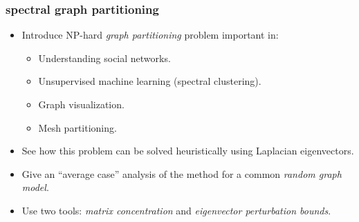 \documentclass[compress]{beamer}
\newcommand{\bv}[1]{\mathbf{#1}}
\DeclareMathOperator*{\argmax}{arg\,max}
\begin{document}

\begin{frame}
	\frametitle{spectral graph partitioning}
	\begin{itemize}
		\item Introduce NP-hard \emph{graph partitioning} problem important in:
		\begin{itemize}
			\item Understanding social networks. 
			\item Unsupervised machine learning (spectral clustering).
			\item Graph visualization. 
			\item Mesh partitioning.
		\end{itemize}
		\item See how this problem can be solved heuristically using Laplacian eigenvectors. 
		\item Give an ``average case'' analysis of the method for a common \emph{random graph model}.
		\item Use two tools: \emph{matrix concentration} and \emph{eigenvector perturbation bounds}.
	\end{itemize}
\end{frame}
\end{document}
